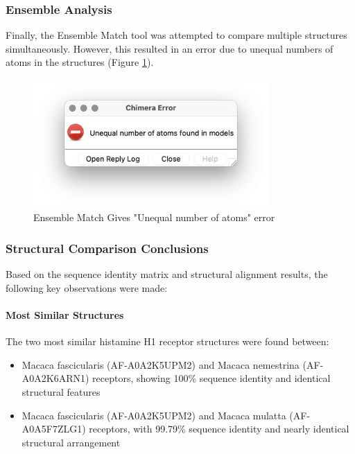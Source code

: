 \documentclass[11pt, a4paper, hidelinks]{article}
\begin{document}
\subsubsection{Ensemble Analysis}\label{subsubsec:histamine-ensemble}
Finally, the Ensemble Match tool was attempted to compare multiple structures simultaneously. However, this resulted in an error due to unequal numbers of atoms in the structures (Figure \ref{fig:histamine-ensemble-match}).

\begin{figure}[H]
    \centering
    \includegraphics[width=0.8\textwidth]{CAA84380.1/_img/ensemble match}
    \caption{Ensemble Match Gives "Unequal number of atoms" error}
    \label{fig:histamine-ensemble-match}
\end{figure}

\subsubsection{Structural Comparison Conclusions}\label{subsubsec:histamine-conclusions}

Based on the sequence identity matrix and structural alignment results, the following key observations were made:

\paragraph{Most Similar Structures} The two most similar histamine H1 receptor structures were found between:
\begin{itemize}
    \item Macaca fascicularis (AF-A0A2K5UPM2) and Macaca nemestrina (AF-A0A2K6ARN1) receptors, showing 100\% sequence identity and identical structural features
    \item Macaca fascicularis (AF-A0A2K5UPM2) and Macaca mulatta (AF-A0A5F7ZLG1) receptors, with 99.79\% sequence identity and nearly identical structural arrangement
\end{itemize}
\end{document}
